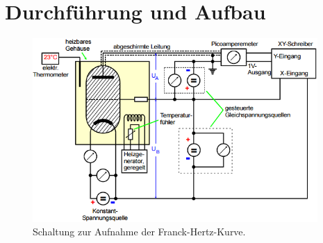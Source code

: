 \section{Durchführung und Aufbau}
\label{sec:Durchführung}

\begin{figure}[H]
  \centering
  \includegraphics[height=7cm]{picture/Schaltung}
  \caption{Schaltung zur Aufnahme der Franck-Hertz-Kurve. \cite[10]{sample}}
  \label{fig:Schaltung}
\end{figure}

